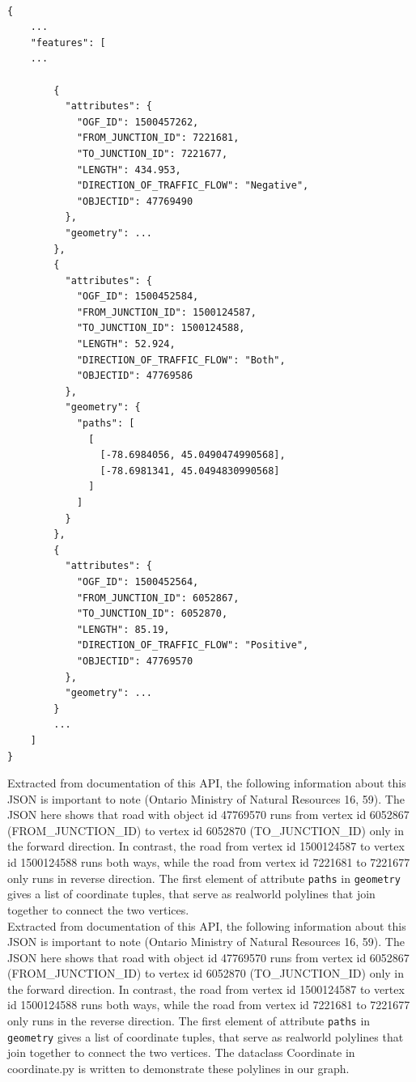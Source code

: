 \documentclass[fontsize=11pt]{article}
\begin{document}
\begin{verbatim}

{
    ...
    "features": [
    ...

        {
          "attributes": {
            "OGF_ID": 1500457262,
            "FROM_JUNCTION_ID": 7221681,
            "TO_JUNCTION_ID": 7221677,
            "LENGTH": 434.953,
            "DIRECTION_OF_TRAFFIC_FLOW": "Negative",
            "OBJECTID": 47769490
          },
          "geometry": ...
        },
        {
          "attributes": {
            "OGF_ID": 1500452584,
            "FROM_JUNCTION_ID": 1500124587,
            "TO_JUNCTION_ID": 1500124588,
            "LENGTH": 52.924,
            "DIRECTION_OF_TRAFFIC_FLOW": "Both",
            "OBJECTID": 47769586
          },
          "geometry": {
            "paths": [
              [
                [-78.6984056, 45.0490474990568],
                [-78.6981341, 45.0494830990568]
              ]
            ]
          }
        },
        {
          "attributes": {
            "OGF_ID": 1500452564,
            "FROM_JUNCTION_ID": 6052867,
            "TO_JUNCTION_ID": 6052870,
            "LENGTH": 85.19,
            "DIRECTION_OF_TRAFFIC_FLOW": "Positive",
            "OBJECTID": 47769570
          },
          "geometry": ...
        }
        ...
    ]
}

\end{verbatim}

Extracted from documentation of this API, the following information about this JSON is important to note (Ontario Ministry of Natural Resources 16, 59). The JSON here shows that road with object id 47769570 runs from vertex id 6052867 (FROM\_JUNCTION\_ID) to vertex id 6052870 (TO\_JUNCTION\_ID) only in the forward direction. In contrast, the road from vertex id 1500124587 to vertex id 1500124588 runs both ways, while the road from vertex id 7221681 to 7221677 only runs in reverse direction. The first element of attribute \texttt{paths} in \texttt{geometry} gives a list of coordinate tuples, that serve as realworld polylines that join together to connect the two vertices. \\
Extracted from documentation of this API, the following information about this JSON is important to note (Ontario Ministry of Natural Resources 16, 59). The JSON here shows that road with object id 47769570 runs from vertex id 6052867 (FROM\_JUNCTION\_ID) to vertex id 6052870 (TO\_JUNCTION\_ID) only in the forward direction. In contrast, the road from vertex id 1500124587 to vertex id 1500124588 runs both ways, while the road from vertex id 7221681 to 7221677 only runs in the reverse direction. The first element of attribute \texttt{paths} in \texttt{geometry} gives a list of coordinate tuples, that serve as realworld polylines that join together to connect the two vertices. The dataclass Coordinate in coordinate.py is written to demonstrate these polylines in our graph.  \\
\end{document}
